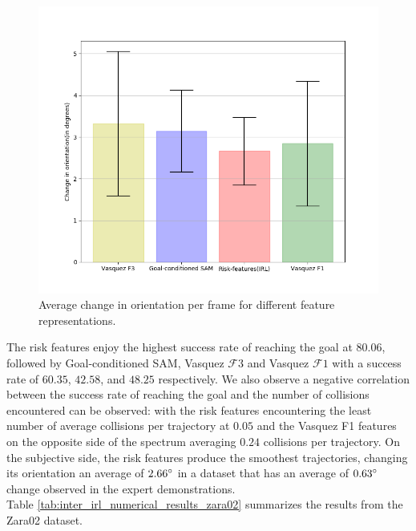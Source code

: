 \begin{figure}[htbp]
	\includegraphics[width=.95\linewidth]{plots/plot_without_outliers/zara02_inter_irl_no_outlier/compute_trajectory_smoothness_zara02_no_outlier_inter_irl_traj_5.png}
	\caption{Average change in orientation per frame for different feature representations.}
	\label{fig:inter_irl-trajectory_smoothness-zara02}
\end{figure}

 The risk features enjoy the highest success rate of reaching the goal at $80.06$, followed by Goal-conditioned SAM, Vasquez $\mathcal{F}3$ and Vasquez $\mathcal{F}1$ with a success rate of $60.35$, $42.58$, and $48.25$ respectively.  We also observe a negative correlation between the success rate of reaching the goal and the number of collisions encountered can be observed: with the risk features encountering the least number of average collisions per trajectory at $0.05$ and the Vasquez F1 features on the opposite side of the spectrum averaging $0.24$ collisions per trajectory.  
On the subjective side, the risk features produce the smoothest trajectories, changing its orientation an average of $2.66\degree$ in a dataset that has an average of $0.63\degree$ change observed in the expert demonstrations.\\
Table \autoref{tab:inter_irl_numerical_results_zara02} summarizes the results from the Zara02 dataset.

